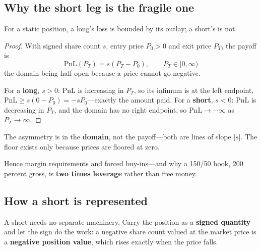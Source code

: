 \subsection{Why the short leg is the fragile one}\label{sec:short-fragile}

\begin{claim}\label{clm:short-unbounded}
For a static position, a long's loss is bounded by its outlay; a short's is not.
\end{claim}

\begin{proof}
With signed share count $s$, entry price $P_0 > 0$ and exit price $P_T$, the payoff is
\[
  \mathrm{PnL}(P_T) = s \left( P_T - P_0 \right), \qquad P_T \in [0, \infty)
\]
the domain being half-open because a price cannot go negative.

For a \textbf{long}, $s > 0$: $\mathrm{PnL}$ is increasing in $P_T$, so its infimum is at the left
endpoint, $\mathrm{PnL} \geq s(0 - P_0) = -s P_0$---exactly the amount paid. For a \textbf{short},
$s < 0$: $\mathrm{PnL}$ is decreasing in $P_T$, and the domain has no right endpoint, so
$\mathrm{PnL} \to -\infty$ as $P_T \to \infty$.
\end{proof}

The asymmetry is in the \textbf{domain}, not the payoff---both are lines of slope $\left| s \right|$.
The floor exists only because prices are floored at zero.


\begin{note}
Hence margin requirements and forced buy-ins---and why a 150/50 book, 200 percent gross, is
\textbf{two times leverage} rather than free money.
\end{note}

\subsection{How a short is represented}\label{sec:how-a-short-is-represented}

A short needs no separate machinery. Carry the position as a \textbf{signed quantity} and let the
sign do the work: a negative share count valued at the market price is a \textbf{negative position
value}, which rises exactly when the price falls.

